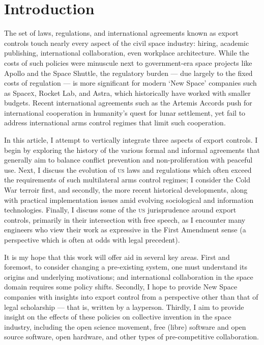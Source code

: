 \documentclass[preprint,twocolumn,5p]{elsarticle}
\begin{document}
\maketitle

\section{Introduction}
The set of laws, regulations, and international agreements known as export controls touch nearly every aspect of the civil space industry: hiring, academic publishing, international collaboration, even workplace architecture. While the costs of such policies were minuscule next to government-era space projects like Apollo and the Space Shuttle, the regulatory burden --- due largely to the fixed costs of regulation \citep{Bradford2004} --- is more significant for modern `New Space' companies such as Space\textsc{x}, Rocket Lab, and Astra, which historically have worked with smaller budgets. Recent international agreements such as the Artemis Accords push for international cooperation in humanity's quest for lunar settlement, yet fail to address international arms control regimes that limit such cooperation.

In this article, I attempt to vertically integrate three aspects of export controls. I begin by exploring the history of the various formal and informal agreements that generally aim to balance conflict prevention and non-proliferation with peaceful use. Next, I discuss the evolution of \textsc{us} laws and regulations which often exceed the requirements of such multilateral arms control regimes; I consider the Cold War terroir first, and secondly, the more recent historical developments, along with practical implementation issues amid evolving sociological and information technologies. Finally, I discuss some of the \textsc{us} jurisprudence around export controls, primarily in their intersection with free speech, as I encounter many engineers who view their work as expressive in the First Amendment sense (a perspective which is often at odds with legal precedent).

It is my hope that this work will offer aid in several key areas. First and foremost, to consider changing a pre-existing system, one must understand its origins and underlying motivations; and international collaboration in the space domain requires some policy shifts. Secondly, I hope to provide New Space companies with insights into export control from a perspective other than that of legal scholarship --- that is, written by a layperson. Thirdly, I aim to provide insight on the effects of these policies on collective invention in the space industry, including the open science movement, free (libre) software and open source software, open hardware, and other types of pre-competitive collaboration.
\end{document}
